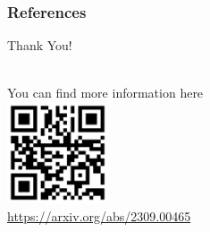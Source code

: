 \documentclass[9pt]{beamer}
\theoremstyle{definition}
\begin{document}

\begin{frame}[fragile]{}
  \frametitle{References}
  \begin{center}
    Thank You!\\

  \end{center}
  \begin{center}
    \\
    You can find more information here \\

    \includegraphics[height=3cm, width=3cm]{images/paper-qr}\\
    \url{https://arxiv.org/abs/2309.00465}

  \end{center}
\end{frame}

\end{document}
